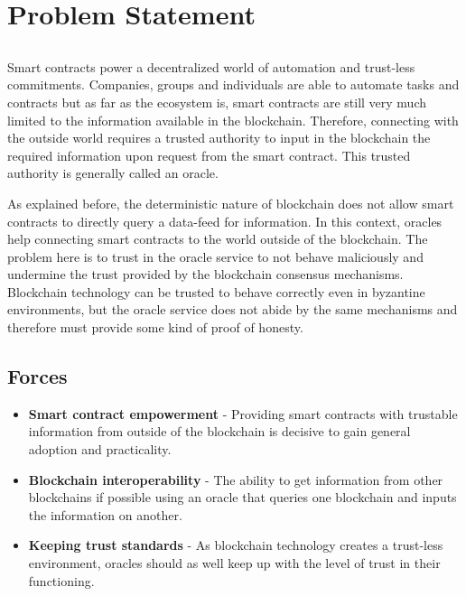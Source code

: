 \chapter{Problem Statement}\label{chap:chap4}

\section*{}


Smart contracts power a decentralized world of automation and trust-less commitments. Companies, groups and individuals are able to automate tasks and contracts but as far as the ecosystem is, smart contracts are still very much limited to the information available in the blockchain. Therefore, connecting with the outside world requires a trusted authority to input in the blockchain the required information upon request from the smart contract. This trusted authority is generally called an oracle.

As explained before, the deterministic nature of blockchain does not allow smart contracts to directly query a data-feed for information. In this context, oracles help connecting smart contracts to the world outside of the blockchain. The problem here is to trust in the oracle service to not behave maliciously and undermine the trust provided by the blockchain consensus mechanisms. Blockchain technology can be trusted to behave correctly even in byzantine environments, but the oracle service does not abide by the same mechanisms and therefore must provide some kind of proof of honesty.

\section{Forces}
\begin{itemize}
    \item \textbf{Smart contract empowerment} - Providing smart contracts with trustable information from outside of the blockchain is decisive to gain general adoption and practicality.
    \item \textbf{Blockchain interoperability} - The ability to get information from other blockchains if possible using an oracle that queries one blockchain and inputs the information on another.
    \item \textbf{Keeping trust standards} - As blockchain technology creates a trust-less environment, oracles should as well keep up with the level of trust in their functioning.
\end{itemize}


